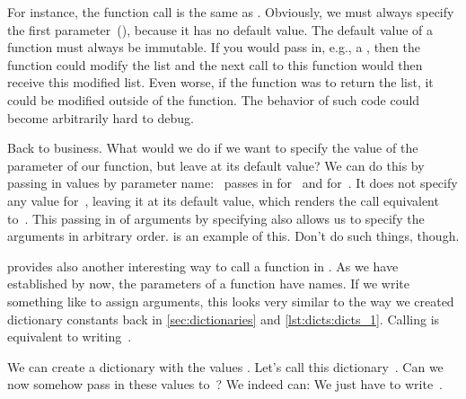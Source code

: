 For instance, the function call  is the same as .
Obviously, we must always specify the first parameter~(), because it has no default value.%
%
%
%
The default value of a function must always be immutable.
If you would pass in, e.g., a , then the function could modify the list and the next call to this function would then receive this modified list.
Even worse, if the function was to return the list, it could be modified outside of the function.
The behavior of such code could become arbitrarily hard to debug.

Back to business.
What would we do if we want to specify the value of the parameter  of our function, but leave  at its default value?
We can do this by passing in values by parameter name:
~passes in  for~ and  for~.
It does not specify any value for~, leaving it at its default value, which renders the call equivalent to~.
This passing in of arguments by specifying  also allows us to specify the arguments in arbitrary order.
 is an example of this.
Don't do such things, though.%
%
\begin{sloppypar}%
 provides also another interesting way to call a function in \python.
As we have established by now, the parameters of a function have names.
If we write something like  to assign arguments, this looks very similar to the way we created dictionary constants back in \cref{sec:dictionaries} and \cref{lst:dicts:dicts_1}.
Calling  is equivalent to writing~.%
\end{sloppypar}%
%
We can create a dictionary with the values .
Let's call this dictionary~.
Can we now somehow pass in these values to~?
We indeed can:
We just have to write~.
